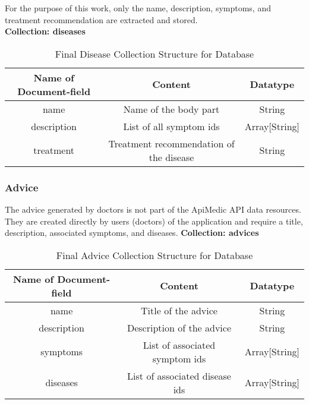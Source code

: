 For the purpose of this work, only the name, description, symptoms, and treatment recommendation are extracted and stored.
\newline \\
\textbf{Collection: diseases}
\begin{table}[H]
	\centering
	\begin{tabular}{ | c| c| c | } 
		\hline
		Name of Document-field& Content & Datatype \\ 
		\hline
		name & Name of the body part & String \\ 
		\hline
		description & List of all symptom ids & Array[String] \\ 
		\hline
		treatment & Treatment recommendation of the disease & String \\ 
		\hline
	\end{tabular}
			 \caption{Final Disease Collection Structure for Database}
\end{table}
\subsubsection{Advice}
The advice generated by doctors is not part of the ApiMedic API data resources. They are created directly by users (doctors) of the application and require a title, description, associated symptoms, and diseases.
 \newline
\textbf{Collection: advices}
\begin{table}[H]
	\centering
	\begin{tabular}{ | c| c| c | } 
		\hline
		Name of Document-field& Content & Datatype \\ 
		\hline
		name & Title of the advice& String \\ 
		\hline
		description & Description of the advice & String \\ 
		\hline
		symptoms & List of associated symptom ids & Array[String]\\ 
		\hline
		diseases & List of associated disease ids & Array[String]\\ 
		\hline
	\end{tabular}
\caption{Final Advice Collection Structure for Database}
\end{table}
